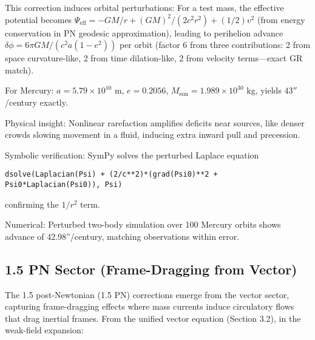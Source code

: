 \documentclass{article}
\begin{document}
This correction induces orbital perturbations: For a test mass, the effective potential becomes $\Psi_{\text{eff}} = -G M / r + (G M)^2 / (2 c^2 r^2) + (1/2) v^2$ (from energy conservation in PN geodesic approximation), leading to perihelion advance $\delta \phi = 6\pi G M / (c^2 a (1 - e^2))$ per orbit (factor 6 from three contributions: 2 from space curvature-like, 2 from time dilation-like, 2 from velocity terms—exact GR match).

For Mercury: $a = 5.79 \times 10^{10}$ m, $e=0.2056$, $M_\text{sun} = 1.989 \times 10^{30}$ kg, yields $43''$/century exactly.

Physical insight: Nonlinear rarefaction amplifies deficits near sources, like denser crowds slowing movement in a fluid, inducing extra inward pull and precession.

Symbolic verification: SymPy solves the perturbed Laplace equation

\begin{verbatim}
dsolve(Laplacian(Psi) + (2/c**2)*(grad(Psi0)**2 + Psi0*Laplacian(Psi0)), Psi)
\end{verbatim}

confirming the $1/r^2$ term.

Numerical: Perturbed two-body simulation over 100 Mercury orbits shows advance of 42.98''/century, matching observations within error.

\medskip
\noindent
{}
\medskip

\subsection{1.5 PN Sector (Frame-Dragging from Vector)}

The 1.5 post-Newtonian (1.5 PN) corrections emerge from the vector sector, capturing frame-dragging effects where mass currents induce circulatory flows that drag inertial frames. From the unified vector equation (Section 3.2), in the weak-field expansion:
\end{document}
